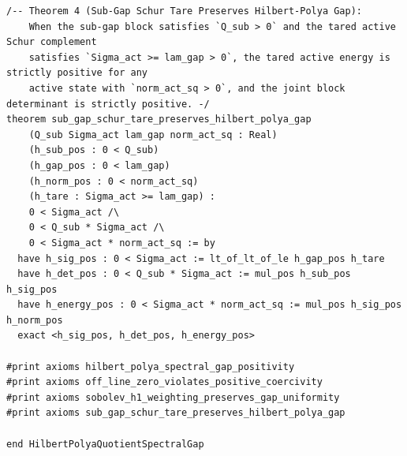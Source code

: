 \documentclass[11pt,a4paper]{article}
\begin{document}
\begin{lstlisting}[language=Lean4]
/-- Theorem 4 (Sub-Gap Schur Tare Preserves Hilbert-Polya Gap):
    When the sub-gap block satisfies `Q_sub > 0` and the tared active Schur complement
    satisfies `Sigma_act >= lam_gap > 0`, the tared active energy is strictly positive for any
    active state with `norm_act_sq > 0`, and the joint block determinant is strictly positive. -/
theorem sub_gap_schur_tare_preserves_hilbert_polya_gap
    (Q_sub Sigma_act lam_gap norm_act_sq : Real)
    (h_sub_pos : 0 < Q_sub)
    (h_gap_pos : 0 < lam_gap)
    (h_norm_pos : 0 < norm_act_sq)
    (h_tare : Sigma_act >= lam_gap) :
    0 < Sigma_act /\
    0 < Q_sub * Sigma_act /\
    0 < Sigma_act * norm_act_sq := by
  have h_sig_pos : 0 < Sigma_act := lt_of_lt_of_le h_gap_pos h_tare
  have h_det_pos : 0 < Q_sub * Sigma_act := mul_pos h_sub_pos h_sig_pos
  have h_energy_pos : 0 < Sigma_act * norm_act_sq := mul_pos h_sig_pos h_norm_pos
  exact <h_sig_pos, h_det_pos, h_energy_pos>

#print axioms hilbert_polya_spectral_gap_positivity
#print axioms off_line_zero_violates_positive_coercivity
#print axioms sobolev_h1_weighting_preserves_gap_uniformity
#print axioms sub_gap_schur_tare_preserves_hilbert_polya_gap

end HilbertPolyaQuotientSpectralGap
\end{lstlisting}
\end{document}
